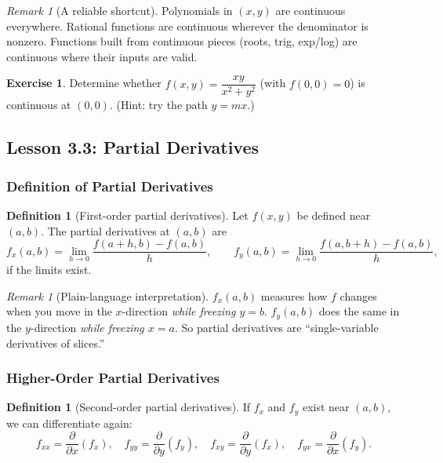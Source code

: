 \documentclass[12pt]{article}
\numberwithin{equation}{section}
\theoremstyle{plain}
\theoremstyle{definition}
\newtheorem{definition}[theorem]{Definition}
\newtheorem{exercise}[theorem]{Exercise}
\theoremstyle{remark}
\newtheorem{remark}[theorem]{Remark}
\begin{document}
\begin{remark}[A reliable shortcut]
Polynomials in $(x,y)$ are continuous everywhere. Rational functions are continuous wherever the denominator is nonzero. Functions built from continuous pieces (roots, trig, exp/log) are continuous where their inputs are valid.
\end{remark}

\begin{exercise}
Determine whether $f(x,y)=\dfrac{xy}{x^2+y^2}$ (with $f(0,0)=0$) is continuous at $(0,0)$.  
(Hint: try the path $y=mx$.)
\end{exercise}

\subsection{Lesson 3.3: Partial Derivatives}

\subsubsection{Definition of Partial Derivatives}

\begin{definition}[First-order partial derivatives]\label{def:partials}
Let $f(x,y)$ be defined near $(a,b)$. The partial derivatives at $(a,b)$ are
\[
f_x(a,b)=\lim_{h\to 0}\frac{f(a+h,b)-f(a,b)}{h},
\qquad
f_y(a,b)=\lim_{h\to 0}\frac{f(a,b+h)-f(a,b)}{h},
\]
if the limits exist.
\end{definition}

\begin{remark}[Plain-language interpretation]
$f_x(a,b)$ measures how $f$ changes when you move in the $x$-direction \emph{while freezing $y=b$}.  
$f_y(a,b)$ does the same in the $y$-direction \emph{while freezing $x=a$}.  
So partial derivatives are “single-variable derivatives of slices.”
\end{remark}

\subsubsection{Higher-Order Partial Derivatives}

\begin{definition}[Second-order partial derivatives]\label{def:secondpartials}
If $f_x$ and $f_y$ exist near $(a,b)$, we can differentiate again:
\[
f_{xx}=\frac{\partial}{\partial x}(f_x),\quad
f_{yy}=\frac{\partial}{\partial y}(f_y),\quad
f_{xy}=\frac{\partial}{\partial y}(f_x),\quad
f_{yx}=\frac{\partial}{\partial x}(f_y).
\]
\end{definition}
\end{document}

